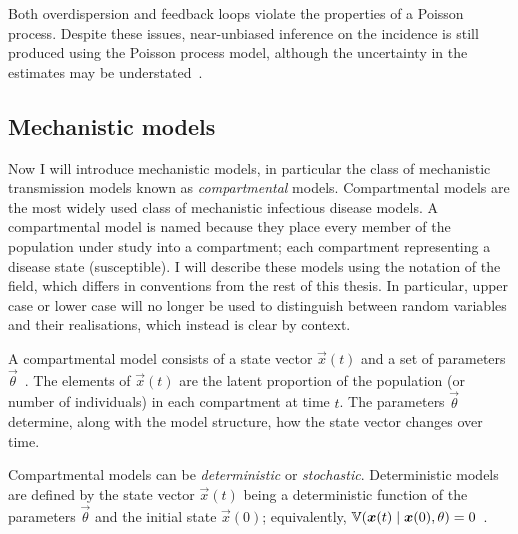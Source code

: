 \documentclass[thesis.tex]{subfiles}
\begin{document}
Both overdispersion and feedback loops violate the properties of a Poisson process.
Despite these issues, near-unbiased inference on the incidence is still produced using the Poisson process model, although the uncertainty in the estimates may be understated~\autocite{beckerDependent}.


\subsection{Mechanistic models} \label{SEIR:sec:mechanistic-models}

Now I will introduce mechanistic models, in particular the class of mechanistic transmission models known as \emph{compartmental} models.
Compartmental models are the most widely used class of mechanistic infectious disease models.
A compartmental model is named because they place every member of the population under study into a compartment; each compartment representing a disease state (\eg susceptible).
I will describe these models using the notation of the field, which differs in conventions from the rest of this thesis.
In particular, upper case or lower case will no longer be used to distinguish between random variables and their realisations, which instead is clear by context.

A compartmental model consists of a state vector $\vec{x}(t)$ and a set of parameters $\vec{\theta}$~\autocite{birrellEvidence,dukicTracking,corbellaThesis}.
The elements of $\vec{x}(t)$ are the latent proportion of the population (or number of individuals) in each compartment at time $t$.
The parameters $\vec{\theta}$ determine, along with the model structure, how the state vector changes over time.

Compartmental models can be \emph{deterministic} or \emph{stochastic}.
Deterministic models are defined by the state vector $\vec{x}(t)$ being a deterministic function of the parameters $\vec{\theta}$ and the initial state $\vec{x}(0)$; equivalently, $\operatorname{\mathbb{V}}(\bm{x}(t) \mid \bm{x}(0), \theta) = 0$~\autocite{birrellEvidence}.
\end{document}
